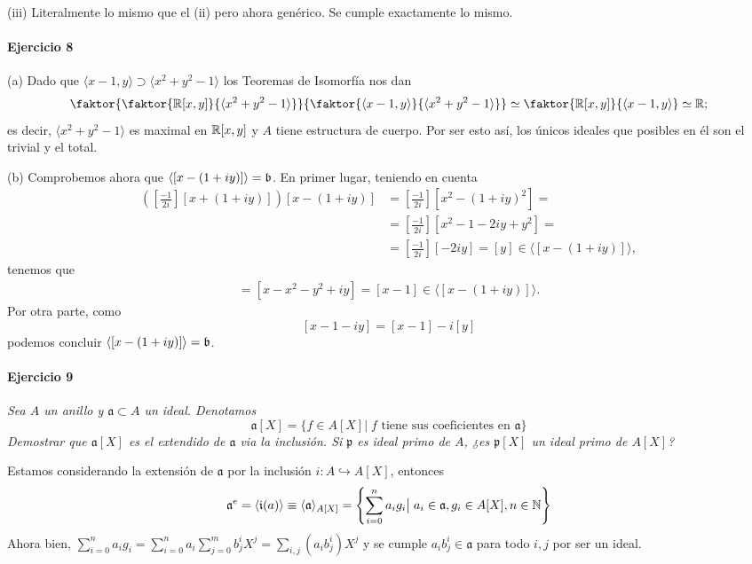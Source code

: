 \documentclass[../main.tex]{subfiles}
\begin{document}
(iii) Literalmente lo mismo que el (ii) pero ahora genérico. Se cumple exactamente lo mismo.

\paragraph{Ejercicio 8}
(a) Dado que $\langle x-1,y\rangle\supset\langle x^2+y^2-1\rangle$ los Teoremas de Isomorfía nos dan
$$\faktor{\faktor{\R[x,y]}{\langle x^2+y^2-1\rangle}}{\faktor{\langle x-1,y\rangle}{\langle x^2+y^2-1\rangle}}\simeq\faktor{\R[x,y]}{\langle x-1,y\rangle}\simeq\R;$$
es decir, $\langle x^2+y^2-1\rangle$ es maximal en $\mathbb{R}[x,y]$ y $A$ tiene estructura de cuerpo. Por ser esto así, los únicos ideales que posibles en él son el trivial y el total.

(b) Comprobemos ahora que $\langle[x-(1+iy)]\rangle=\mathfrak{b}$. En primer lugar, teniendo en cuenta 
\begin{align*}
\left(\left[\frac{-1}{2i}\right][x+(1+iy)]\right)[x-(1+iy)]&=\left[\frac{-1}{2i}\right][x^2-(1+iy)^2]=\\
&=\left[\frac{-1}{2i}\right][x^2-1-2iy+y^2]=\\
&=\left[\frac{-1}{2i}\right][-2iy]=[y]\in\langle [x-(1+iy)]\rangle,
\end{align*}
tenemos que
\begin{align*}
[-x-iy][x-1-iy]=[x-x^2-y^2+iy]=[x-1]\in\langle [x-(1+iy)]\rangle.
\end{align*}
Por otra parte, como 
$$[x-1-iy]=[x-1]-i[y]$$
podemos concluir $\langle[x-(1+iy)]\rangle=\mathfrak{b}$.

\paragraph{Ejercicio 9} \textit{Sea $A$ un anillo y $\mathfrak a \subset A$ un ideal. Denotamos
\[\mathfrak a [X] = \{ f \in A[X] \vert \; f \text{ tiene sus coeficientes en } \mathfrak a\}\]
Demostrar que $\mathfrak a[X]$ es el extendido de $\mathfrak a$ via la inclusión. Si $\mathfrak p$ es ideal primo de $A$, ¿es $\mathfrak p[X]$ un ideal primo de $A[X]$?}

Estamos considerando la extensión de $\mathfrak a$ por la inclusión $i:A\hookrightarrow A[X]$, entonces
$$
\mathfrak a^e = \langle \mathfrak i(a) \rangle \equiv \langle \mathfrak a\rangle_{A[X]} = \left\{\sum_{i=0}^n a_i g_i\big \vert\; a_i \in \mathfrak a, g_i \in A[X],n\in \mathbb{N}   \right\}
$$
Ahora bien, $\sum_{i=0}^n a_i g_i = \sum_{i=0}^n a_i \sum_{j=0}^m b^i_j X^j = \sum_{i,j}(a_ib^i_j) X^j$ y se cumple  $a_ib^i_j \in  \mathfrak a$ para todo $i,j$ por ser un ideal.
\end{document}
